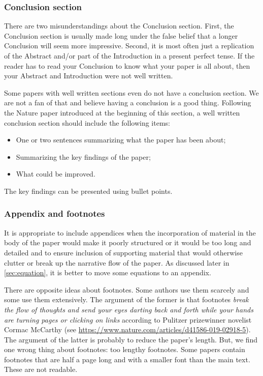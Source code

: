 \documentclass[authoryear,3p,times,preprint,review,fleqn]{elsarticle}
\numberwithin{equation}{section}
\theoremstyle{remark}
\begin{document}
\subsubsection{Conclusion section}\label{sec:conclusion-part}

There are two misunderstandings about the Conclusion section. First, the Conclusion section is usually made long under the false belief that a longer Conclusion will seem more impressive. Second, it is most often just a replication of the Abstract and/or part of the Introduction in a present perfect tense. If the reader has to read your Conclusion to know what your paper is all about, then your Abstract and Introduction were not well written.

Some papers with well written sections even do not have a conclusion section. We are not a fan of that and believe having a conclusion is a good thing. Following the Nature paper introduced at the beginning of this section, a well written conclusion section should include the following items:

\begin{itemize}
\item One or two sentences summarizing what the paper has been about;
\item Summarizing the key findings of the paper;
\item What could be improved.
\end{itemize}
The key findings can be presented using bullet points.

\subsubsection{Appendix and footnotes}\label{sec:appendix-footnotes}

It is appropriate to include appendices when
the incorporation of material in the body of the paper would make it poorly structured or it would be too long and detailed and to ensure inclusion of supporting material that would otherwise clutter or break up the narrative flow of the paper.
As discussed later in \cref{sec:equation}, it is better to move some equations to an appendix.

There are opposite ideas about footnotes. Some authors use them scarcely and some use them extensively. The argument of the former is that footnotes \textit{break the flow of thoughts and send your eyes darting back and forth while your hands are turning pages or clicking on links} according to Pulitzer prizewinner novelist Cormac McCarthy (see \url{https://www.nature.com/articles/d41586-019-02918-5}). The argument of the latter is probably to reduce the paper's length. But, we find one wrong thing about footnotes: too lengthy footnotes. Some papers contain footnotes that are half a page long and with a smaller font than the main text. These are not readable.
\end{document}
